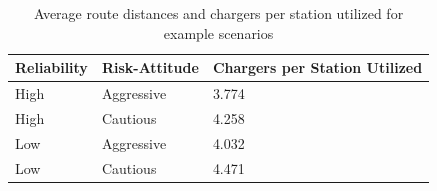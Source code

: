 \begin{table}[H]
	\centering
	\caption{Average route distances and chargers per station utilized for example scenarios}
	\label{tab:distances_redundancy}
	\begin{tabular}{|C{\linewidth / 3}|C{\linewidth / 3}|C{\linewidth / 3}|}
		\hline Reliability & Risk-Attitude & Chargers per Station Utilized \\
		\hline High & Aggressive & 3.774 \\
		\hline High & Cautious & 4.258 \\
		\hline Low & Aggressive & 4.032 \\
		\hline Low & Cautious & 4.471 \\
		\hline
	\end{tabular}
\end{table}